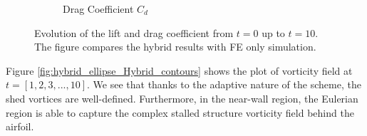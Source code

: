 \begin{figure}[!p]
\begin{subfigure}[t]{0.49\textwidth}
             \caption{Drag Coefficient $C_d$}
             \label{fig:hybrid_ellipseForce_CD}
     \end{subfigure}
     \caption{Evolution of the lift and drag coefficient from $t=0$ up to $t=10$. The figure compares the hybrid results with FE only simulation.}
     \label{fig:hybrid_ellipseForce}
	\end{figure}	





%
%


Figure \ref{fig:hybrid_ellipse_Hybrid_contours} shows the plot of vorticity field at $t=[1,2,3,...,10]$. We see that thanks to the adaptive nature of the scheme, the shed vortices are well-defined. Furthermore, in the near-wall region, the Eulerian region is able to capture the complex stalled structure vorticity field behind the airfoil.
	
